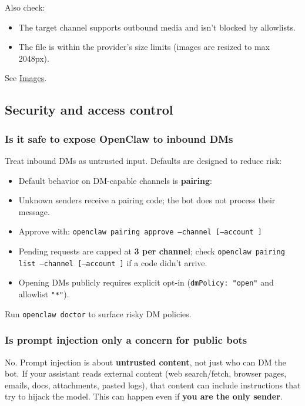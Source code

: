 Also check:

\begin{itemize}
  \item The target channel supports outbound media and isn't blocked by allowlists.
  \item The file is within the provider's size limits (images are resized to max 2048px).
\end{itemize}


See \href{/nodes/images}{Images}.

\subsection{Security and access control}


\subsubsection{Is it safe to expose OpenClaw to inbound DMs}


Treat inbound DMs as untrusted input. Defaults are designed to reduce risk:

\begin{itemize}
  \item Default behavior on DM-capable channels is \textbf{pairing}:
  \item Unknown senders receive a pairing code; the bot does not process their message.
  \item Approve with: \texttt{openclaw pairing approve --channel  [--account ] }
  \item Pending requests are capped at \textbf{3 per channel}; check \texttt{openclaw pairing list --channel  [--account ]} if a code didn't arrive.
  \item Opening DMs publicly requires explicit opt-in (\texttt{dmPolicy: "open"} and allowlist \texttt{"*"}).
\end{itemize}


Run \texttt{openclaw doctor} to surface risky DM policies.

\subsubsection{Is prompt injection only a concern for public bots}


No. Prompt injection is about \textbf{untrusted content}, not just who can DM the bot.
If your assistant reads external content (web search/fetch, browser pages, emails,
docs, attachments, pasted logs), that content can include instructions that try
to hijack the model. This can happen even if \textbf{you are the only sender}.

